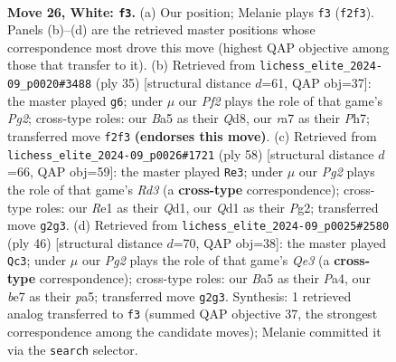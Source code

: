 \documentclass[11pt]{article}
\begin{document}
\clearpage

\begin{figure}[p]\centering
\begin{subfigure}{0.46\textwidth}\centering
\resizebox{\linewidth}{!}{%
\newchessgame
\chessboard[
  setfen={1Nr5/rp2bpk1/p3p3/B7/4q2p/4P3/PP3PPP/R2QR1K1 w - - 0 26},
  showmover=false,
  pgfstyle=straightmove, color=movearrow, markmove={f2-f3}
]}
\caption{}
\end{subfigure}\hfill
\begin{subfigure}{0.46\textwidth}\centering
\resizebox{\linewidth}{!}{%
\newchessgame
\chessboard[
  setfen={3q1rk1/5ppp/2r5/ppP4R/8/6Pb/PPQ2P1P/R1B3K1 b - - 1 18},
  showmover=false,
  pgfstyle=straightmove, color=movearrow, markmove={g7-g6}
]}
\caption{}
\end{subfigure}
\\[4pt]
\begin{subfigure}{0.46\textwidth}\centering
\resizebox{\linewidth}{!}{%
\newchessgame
\chessboard[
  setfen={6k1/2r1pp1p/2N2bp1/2pP4/4q3/P2R3P/5PP1/3Q2K1 w - - 2 30},
  showmover=false,
  pgfstyle=straightmove, color=movearrow, markmove={d3-e3}
]}
\caption{}
\end{subfigure}\hfill
\begin{subfigure}{0.46\textwidth}\centering
\resizebox{\linewidth}{!}{%
\newchessgame
\chessboard[
  setfen={3r2k1/3b1p1p/3p1qp1/pN1Pp3/P7/4Q3/1r3PPP/R4RK1 w - - 0 24},
  showmover=false,
  pgfstyle=straightmove, color=movearrow, markmove={e3-c3}
]}
\caption{}
\end{subfigure}
\caption{\textbf{Move 26, White: \texttt{f3}.} (a) Our position; Melanie plays \texttt{f3} (\texttt{f2f3}). Panels (b)--(d) are the retrieved master positions whose correspondence most drove this move (highest QAP objective among those that transfer to it). (b) Retrieved from \texttt{lichess\_elite\_2024-09\_p0020\#3488} (ply 35) [structural distance $d$=61, QAP obj=37]: the master played \texttt{g6}; under $\mu$ our \emph{Pf2} plays the role of that game's \emph{Pg2}; cross-type roles: our \emph{B}a5 as their \emph{Q}d8, our \emph{r}a7 as their \emph{P}h7; transferred move \texttt{f2f3} \textbf{(endorses this move)}. (c) Retrieved from \texttt{lichess\_elite\_2024-09\_p0026\#1721} (ply 58) [structural distance $d$=66, QAP obj=59]: the master played \texttt{Re3}; under $\mu$ our \emph{Pg2} plays the role of that game's \emph{Rd3} (a \textbf{cross-type} correspondence); cross-type roles: our \emph{R}e1 as their \emph{Q}d1, our \emph{Q}d1 as their \emph{P}g2; transferred move \texttt{g2g3}. (d) Retrieved from \texttt{lichess\_elite\_2024-09\_p0025\#2580} (ply 46) [structural distance $d$=70, QAP obj=38]: the master played \texttt{Qc3}; under $\mu$ our \emph{Pg2} plays the role of that game's \emph{Qe3} (a \textbf{cross-type} correspondence); cross-type roles: our \emph{B}a5 as their \emph{P}a4, our \emph{b}e7 as their \emph{p}a5; transferred move \texttt{g2g3}. Synthesis: 1 retrieved analog transferred to \texttt{f3} (summed QAP objective 37, the strongest correspondence among the candidate moves); Melanie committed it via the \texttt{search} selector.}
\label{fig:thought-m50}
\end{figure}
\end{document}
